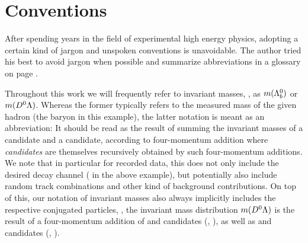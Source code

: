 \chapter*{Conventions}
After spending years in the field of experimental high energy physics, adopting a certain kind of jargon and unspoken conventions is unavoidable.
The author tried his best to avoid jargon when possible and summarize abbreviations in a glossary on page \pageref{glossary}.

Throughout this work we will frequently refer to invariant masses, \eg{}, as $m({{\Lambda}^0_{b}})$ or $m({{D}^0}{\Lambda})$.
Whereas the former typically refers to the measured mass of the given hadron (the \Lb baryon in this example), the latter notation is meant as an abbreviation:
It should be read as the result of summing the invariant masses of a \Dz candidate and a \Lz candidate, according to four-momentum addition where \textit{candidates} are themselves recursively obtained by such four-momentum additions.
We note that in particular for recorded data, this does not only include the desired decay channel (\decay{\Lb}{\Dz\Lz} in the above example), but potentially also include random track combinations and other kind of background contributions.
On top of this, our notation of invariant masses also always implicitly includes the respective \CP conjugated particles, \eg{}, the invariant mass distribution $m({{D}^0}{\Lambda})$ is the result of a four-momentum addition of \Dz and \Lz candidates (\eg{}, \decay{\Lb}{\Dz\Lz}), as well as \Dzb and \Lbar candidates (\eg{}, \decay{\Lbbar}{\Dzb\Lbar}).

